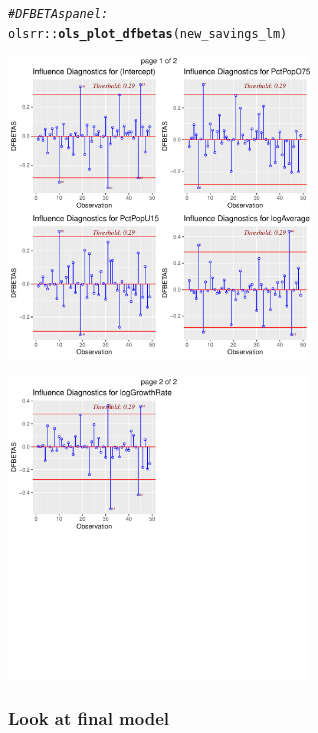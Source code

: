 \documentclass{article}\usepackage[]{graphicx}\usepackage[]{color}
\makeatletter
\newcommand{\hlcom}[1]{\textcolor[rgb]{0.678,0.584,0.686}{\textit{#1}}}%
\newcommand{\hlopt}[1]{\textcolor[rgb]{0,0,0}{#1}}%
\newcommand{\hlstd}[1]{\textcolor[rgb]{0.345,0.345,0.345}{#1}}%
\newcommand{\hlkwd}[1]{\textcolor[rgb]{0.737,0.353,0.396}{\textbf{#1}}}%
\newenvironment{kframe}{%
 \def\at@end@of@kframe{}%
 \ifinner\ifhmode%
  \def\at@end@of@kframe{\end{minipage}}%
  \begin{minipage}{\columnwidth}%
 \fi\fi%
 \def\FrameCommand##1{\hskip\@totalleftmargin \hskip-\fboxsep
 \colorbox{shadecolor}{##1}\hskip-\fboxsep
     \hskip-\linewidth \hskip-\@totalleftmargin \hskip\columnwidth}%
 \MakeFramed {\advance\hsize-\width
   \@totalleftmargin\z@ \linewidth\hsize
   \@setminipage}}%
 {\par\unskip\endMakeFramed%
 \at@end@of@kframe}
\newenvironment{knitrout}{}{} %
\makeatother
\begin{document}
\begin{knitrout}
\color{fgcolor}\begin{kframe}
\begin{alltt}
\hlcom{# DFBETAs panel:}
\hlstd{olsrr}\hlopt{::}\hlkwd{ols_plot_dfbetas}\hlstd{(new_savings_lm)}
\end{alltt}
\end{kframe}

{\centering \includegraphics[width=0.6\textwidth]{figure/unnamed-chunk-12-1} 

}




{\centering \includegraphics[width=0.6\textwidth]{figure/unnamed-chunk-12-2} 

}



\end{knitrout}

\newpage

\subsubsection*{Look at final model}
\end{document}
